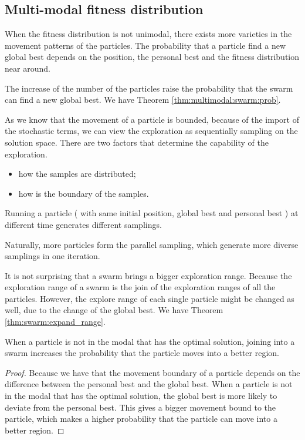 \subsection{Multi-modal fitness distribution}

When the fitness distribution is not unimodal, there exists more varieties in the movement patterns of the particles.
The probability that a particle find a new global best depends on the position, the personal best and the fitness distribution near around.

The increase of the number of the particles raise the probability that the swarm can find a new global best.
We have Theorem \ref{thm:multimodal:swarm:prob}.

As we know that the movement of a particle is bounded, because of the import of the stochastic terms, we can view the exploration as sequentially sampling on the solution space.
There are two factors that determine the capability of the exploration.
\begin{itemize}
\item how the samples are distributed;
\item how is the boundary of the samples.
\end{itemize}

\begin{myprop}
\label{prop:swarm:more_samplings}
Running a particle ( with same initial position, global best and personal best ) at different time generates different samplings.
\end{myprop}
Naturally, more particles form the parallel sampling, which generate more diverse samplings in one iteration.

It is not surprising that a swarm brings a bigger exploration range.
Because the exploration range of a swarm is the join of the exploration ranges of all the particles.
However, the explore range of each single particle might be changed as well, due to the change of the global best.
We have Theorem \ref{thm:swarm:expand_range}.

\begin{mythm}
\label{thm:swarm:expand_range}
When a particle is not in the modal that has the optimal solution, joining into a swarm increases the probability that the particle moves into a better region.
\begin{proof}
Because we have that the movement boundary of a particle depends on the difference between the personal best and the global best.
When a particle is not in the modal that has the optimal solution, the global best is more likely to deviate from the personal best.
This gives a bigger movement bound to the particle, which makes a higher probability that the particle can move into a better region.
\end{proof}
\end{mythm}

